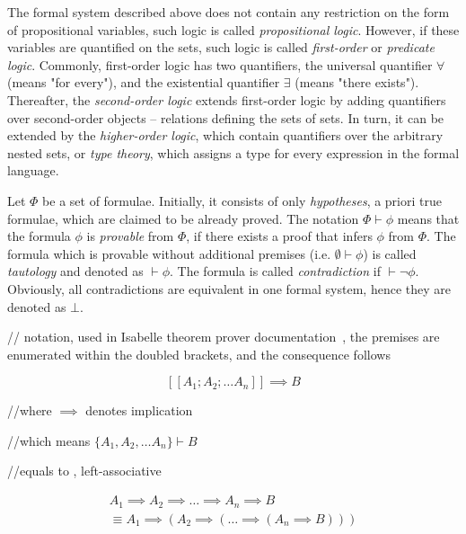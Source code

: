 \documentclass[article]{aaltoseries}
\begin{document}
The formal system described above does not contain any restriction on the form of propositional variables, such logic is called \textit{propositional logic}. However, if these variables are quantified on the sets, such logic is called \textit{first-order} or \textit{predicate logic}. Commonly, first-order logic has two quantifiers, the universal quantifier $\forall$ (means "for every"), and the existential quantifier $\exists$ (means "there exists"). Thereafter, the \textit{second-order logic} extends first-order logic by adding quantifiers over second-order objects -- relations defining the sets of sets. In turn, it can be extended by the \textit{higher-order logic}, which contain quantifiers over the arbitrary nested sets, or \textit{type theory}, which assigns a type for every expression in the formal language.

Let $\Phi$ be a set of formulae. Initially, it consists of only \textit{hypotheses}, a priori true formulae, which are claimed to be already proved. The notation $\Phi \vdash \phi$ means that the formula $\phi$ is \textit{provable} from $\Phi$, if there exists a proof that infers $\phi$ from $\Phi$. The formula which is provable without additional premises (i.e. $\emptyset \vdash \phi$) is called \textit{tautology} and denoted as $ \vdash \phi $. The formula is called \textit{contradiction} if $\vdash \neg \phi$. Obviously, all contradictions are equivalent in one formal system, hence they are denoted as $\bot$.

// notation, used in Isabelle theorem prover documentation~\cite{tool_Isabelle}, the premises are enumerated within the doubled brackets, and the consequence follows

\begin{equation}\label{notation_infrule}
[\![ A_{1}; A_{2}; \dots A_{n} ]\!] \implies B
\end{equation}

//where $\implies$ denotes implication

//which means $ \{ A_{1}, A_{2}, \dots A_{n} \} \vdash B$

//equals to , left-associative

\begin{equation}
\begin{aligned}
A_{1} \implies A_{2} \implies \dots \implies A_{n} \implies B\\
  \equiv A_{1} \implies ( A_{2} \implies ( \dots \implies ( A_{n} \implies B)))
\end{aligned}
\end{equation}
\end{document}
